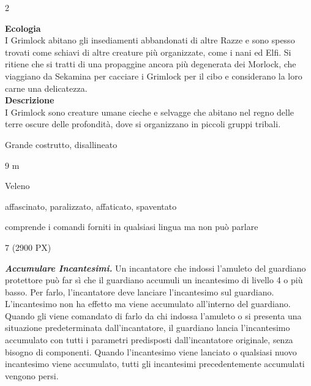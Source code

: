 \begin{multicols}{2}
{\textbf{Ecologia}\\
I Grimlock abitano gli insediamenti abbandonati di altre Razze e sono spesso trovati come schiavi di altre creature più organizzate, come i nani ed Elfi. Si ritiene che si tratti di una propaggine ancora più degenerata dei Morlock, che viaggiano da Sekamina per cacciare i Grimlock per il cibo e considerano la loro carne una delicatezza.\\
\textbf{Descrizione}\\
I Grimlock sono creature umane cieche e selvagge che abitano nel regno delle terre oscure delle profondità, dove si organizzano in piccoli gruppi tribali.

\begin{description}[noitemsep, topsep=0pt, parsep=0pt, partopsep=0pt, itemsep=1pt, leftmargin=2.35cm,  labelwidth=2.2cm, itemindent=0cm, listparindent=0pt] %
\setlength{\baselineskip}{10pt}
\item[\textbf{Taglia/Tipo}] Grande costrutto, disallineato
\item[\textbf{Caratt.}] 
\item[\textbf{Punti Ferita}] 
\item[\textbf{Movimento}] 9 m
\item[\textbf{Tiri Salvez.}] 
\item[\textbf{Imm. Danni}] Veleno
\item[\textbf{Immunità}] affascinato, paralizzato, affaticato, spaventato
\item[\textbf{Sensi}] 
\item[\textbf{Linguaggi}] comprende i comandi forniti in qualsiasi lingua ma non può parlare
\item[\textbf{Sfida}] 7 (2900 PX)
\end{description}
\smallskip

\emph{\textbf{Accumulare Incantesimi.}} Un incantatore che indossi l'amuleto del guardiano protettore può far sì che il guardiano accumuli un incantesimo di livello 4 o più basso. Per farlo, l'incantatore deve lanciare l'incantesimo sul guardiano. L'incantesimo non ha effetto ma viene accumulato all'interno del guardiano. Quando gli viene comandato di farlo da chi indossa l'amuleto o si presenta una situazione predeterminata dall'incantatore, il guardiano lancia l'incantesimo accumulato con tutti i parametri predisposti dall'incantatore originale, senza bisogno di componenti. Quando l'incantesimo viene lanciato o qualsiasi nuovo incantesimo viene accumulato, tutti gli incantesimi precedentemente accumulati vengono persi.

}
\end{multicols}
